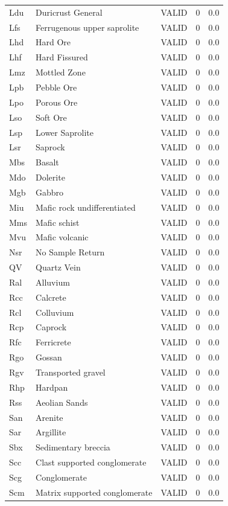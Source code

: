 \begin{table}[htbp]
\begin{tabular}{lllll}
Ldu & Duricrust General & VALID & 0 & 0.0 \\
Lfs & Ferrugenous upper saprolite & VALID & 0 & 0.0 \\
Lhd & Hard Ore & VALID & 0 & 0.0 \\
Lhf & Hard Fissured & VALID & 0 & 0.0 \\
Lmz & Mottled Zone & VALID & 0 & 0.0 \\
Lpb & Pebble Ore & VALID & 0 & 0.0 \\
Lpo & Porous Ore & VALID & 0 & 0.0 \\
Lso & Soft Ore & VALID & 0 & 0.0 \\
Lsp & Lower Saprolite & VALID & 0 & 0.0 \\
Lsr & Saprock & VALID & 0 & 0.0 \\
Mbs & Basalt & VALID & 0 & 0.0 \\
Mdo & Dolerite & VALID & 0 & 0.0 \\
Mgb & Gabbro & VALID & 0 & 0.0 \\
Miu & Mafic rock undifferentiated & VALID & 0 & 0.0 \\
Mms & Mafic schist & VALID & 0 & 0.0 \\
Mvu & Mafic volcanic & VALID & 0 & 0.0 \\
Nsr & No Sample Return & VALID & 0 & 0.0 \\
QV & Quartz Vein & VALID & 0 & 0.0 \\
Ral & Alluvium & VALID & 0 & 0.0 \\
Rcc & Calcrete & VALID & 0 & 0.0 \\
Rcl & Colluvium & VALID & 0 & 0.0 \\
Rcp & Caprock & VALID & 0 & 0.0 \\
Rfc & Ferricrete & VALID & 0 & 0.0 \\
Rgo & Gossan & VALID & 0 & 0.0 \\
Rgv & Transported gravel & VALID & 0 & 0.0 \\
Rhp & Hardpan & VALID & 0 & 0.0 \\
Rss & Aeolian Sands & VALID & 0 & 0.0 \\
San & Arenite & VALID & 0 & 0.0 \\
Sar & Argillite & VALID & 0 & 0.0 \\
Sbx & Sedimentary breccia & VALID & 0 & 0.0 \\
Scc & Clast supported conglomerate & VALID & 0 & 0.0 \\
Scg & Conglomerate & VALID & 0 & 0.0 \\
Scm & Matrix supported conglomerate & VALID & 0 & 0.0 \\

\end{tabular}
\end{table}
